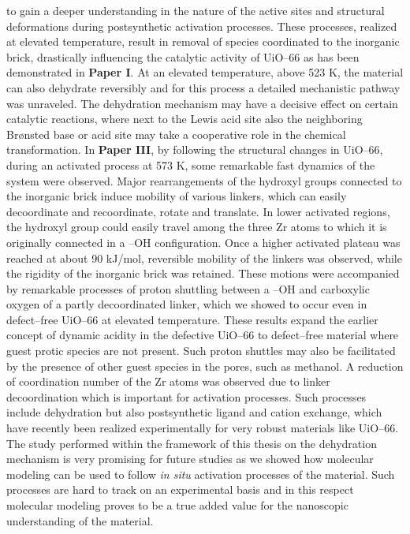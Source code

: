 to gain a deeper understanding in the nature of the active sites and structural
deformations during postsynthetic activation processes. These processes,
realized at elevated temperature, result in removal of species coordinated to
the inorganic brick, drastically influencing the catalytic activity of UiO--66
as has been demonstrated in \textbf{Paper I}. At an elevated temperature, above
523 K, the material can also dehydrate reversibly and for this process a
detailed mechanistic pathway was unraveled. The dehydration mechanism may have a decisive effect on
certain catalytic reactions, where next to the Lewis acid site also the
neighboring Br\o{}nsted base or acid site may take a cooperative role in the
chemical transformation.
\npar
In \textbf{Paper III}, by following the structural changes in UiO--66, during an
activated process at 573 K, some remarkable fast dynamics of the system were
observed. Major rearrangements of the hydroxyl groups connected to the inorganic
brick induce mobility of various linkers, which can easily decoordinate and
recoordinate, rotate and translate. In lower activated regions, the hydroxyl
group could easily travel among the three Zr atoms to which it is originally
connected in a --OH configuration. Once a higher activated
plateau was reached at about 90 kJ/mol, reversible mobility of the linkers was
observed, while the rigidity of the inorganic brick was retained. These motions
were accompanied by remarkable processes of proton shuttling between a
--OH and carboxylic oxygen of a partly decoordinated linker,
which we showed to occur even in defect--free UiO--66 at elevated temperature.
These results expand the earlier concept of dynamic acidity in the defective
UiO--66 to defect--free material where guest protic species are not present.
Such proton shuttles may also be facilitated by the presence of other guest species
in the pores, such as methanol. A reduction of coordination number of the Zr
atoms was observed due to linker decoordination which is important for
activation processes. Such processes include dehydration but also postsynthetic
ligand and cation exchange, which have recently been realized experimentally for very
robust materials like UiO--66. The study performed within the framework of this
thesis on the dehydration mechanism is very promising for future studies as we
showed how molecular modeling can be used to follow \textit{in situ} activation
processes of the material.  Such processes are hard to track on an experimental basis and in this respect molecular modeling proves to be a true added value for the nanoscopic understanding of the material.
